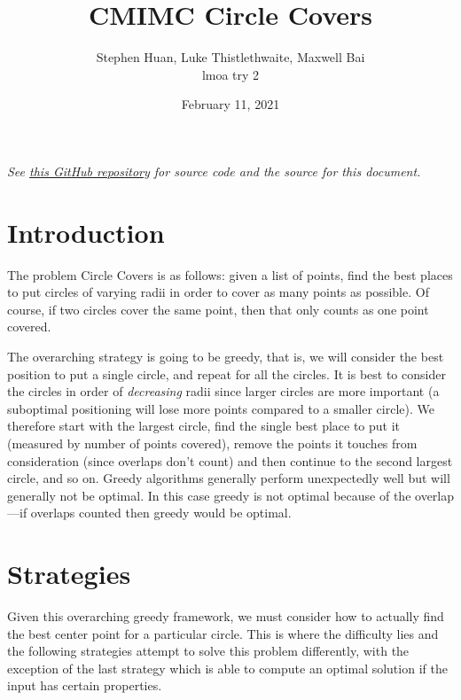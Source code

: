 \documentclass[11pt, oneside]{article}
\title{CMIMC Circle Covers}
\author{Stephen Huan, Luke Thistlethwaite, Maxwell Bai \\ lmoa try 2}
\date{February 11, 2021}
\begin{document}
\maketitle

\textit{See
\href{https://github.com/stephen-huan/cs-lectures/tree/master/senior-computer-team/editorials/cmimc2021}
{this GitHub repository} for source code and the source for this document.}

\section{Introduction}

The problem Circle Covers is as follows: given a list of points,
find the best places to put circles of varying radii in order to
cover as many points as possible. Of course, if two circles cover
the same point, then that only counts as one point covered.

The overarching strategy is going to be greedy, that is, we will consider
the best position to put a single circle, and repeat for all the circles. It
is best to consider the circles in order of \textit{decreasing} radii since
larger circles are more important (a suboptimal positioning will lose more
points compared to a smaller circle). We therefore start with the largest
circle, find the single best place to put it (measured by number of points
covered), remove the points it touches from consideration (since overlaps
don't count) and then continue to the second largest circle, and so on.
Greedy algorithms generally perform unexpectedly well but will generally not
be optimal. In this case greedy is not optimal because of the overlap---if
overlaps counted then greedy would be optimal.

\section{Strategies}
Given this overarching greedy framework, we must consider how to actually find
the best center point for a particular circle. This is where the difficulty
lies and the following strategies attempt to solve this problem differently,
with the exception of the last strategy which is able to compute an optimal
solution if the input has certain properties.
\end{document}
